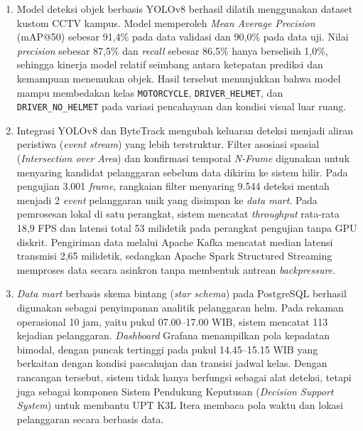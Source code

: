 \begin{enumerate}[1.]
  \item Model deteksi objek berbasis YOLOv8 berhasil dilatih menggunakan dataset kustom CCTV kampus. Model memperoleh \textit{Mean Average Precision} (mAP@50) sebesar 91,4\% pada data validasi dan 90,0\% pada data uji. Nilai \textit{precision} sebesar 87,5\% dan \textit{recall} sebesar 86,5\% hanya berselisih 1,0\%, sehingga kinerja model relatif seimbang antara ketepatan prediksi dan kemampuan menemukan objek. Hasil tersebut menunjukkan bahwa model mampu membedakan kelas \texttt{MOTORCYCLE}, \texttt{DRIVER\_HELMET}, dan \texttt{DRIVER\_NO\_HELMET} pada variasi pencahayaan dan kondisi visual luar ruang.

  \item Integrasi YOLOv8 dan ByteTrack mengubah keluaran deteksi menjadi aliran peristiwa (\textit{event stream}) yang lebih terstruktur. Filter asosiasi spasial (\textit{Intersection over Area}) dan konfirmasi temporal \textit{N-Frame} digunakan untuk menyaring kandidat pelanggaran sebelum data dikirim ke sistem hilir. Pada pengujian 3.001 \textit{frame}, rangkaian filter menyaring 9.544 deteksi mentah menjadi 2 \textit{event} pelanggaran unik yang disimpan ke \textit{data mart}. Pada pemrosesan lokal di satu perangkat, sistem mencatat \textit{throughput} rata-rata 18,9 FPS dan latensi total 53 milidetik pada perangkat pengujian tanpa GPU diskrit. Pengiriman data melalui Apache Kafka mencatat median latensi transmisi 2,65 milidetik, sedangkan Apache Spark Structured Streaming memproses data secara asinkron tanpa membentuk antrean \textit{backpressure}.

  \item \textit{Data mart} berbasis skema bintang (\textit{star schema}) pada PostgreSQL berhasil digunakan sebagai penyimpanan analitik pelanggaran helm. Pada rekaman operasional 10 jam, yaitu pukul 07.00--17.00 WIB, sistem mencatat 113 kejadian pelanggaran. \textit{Dashboard} Grafana menampilkan pola kepadatan bimodal, dengan puncak tertinggi pada pukul 14.45--15.15 WIB yang berkaitan dengan kondisi pascahujan dan transisi jadwal kelas. Dengan rancangan tersebut, sistem tidak hanya berfungsi sebagai alat deteksi, tetapi juga sebagai komponen Sistem Pendukung Keputusan (\textit{Decision Support System}) untuk membantu UPT K3L Itera membaca pola waktu dan lokasi pelanggaran secara berbasis data.
\end{enumerate}

